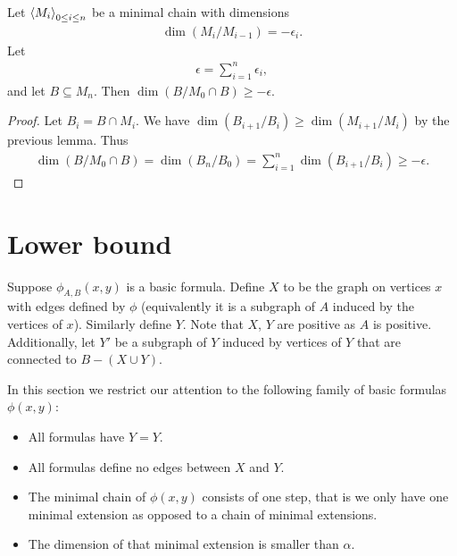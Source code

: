 \begin{Lemma} \label{chain_intersect}
  Let  $\left\langle M_i \right\rangle_{0 \leq i \leq n}$ be  a minimal chain with dimensions
  \begin{align*}
    \dim(M_i/M_{i-1}) = -\epsilon_i.
  \end{align*}
  Let
  \begin{align*}
    \epsilon = \sum_{i = 1}^{n}\epsilon_i,  
  \end{align*}
  and let $B \subseteq M_n$.
  Then $\dim (B / M_0 \cap B) \geq -\epsilon$.
\end{Lemma}

\begin{proof}
  Let $B_i = B \cap M_i$.
  We have $\dim (B_{i+1}/B_i) \geq \dim (M_{i+1}/M_i)$ by the previous lemma.
  Thus
  \begin{align*}
    \dim (B / M_0 \cap B) = \dim (B_n / B_0) = \sum_{i = 1}^n \dim (B_{i+1}/B_i) \geq -\epsilon.
  \end{align*}
\end{proof}

\section{Lower bound}
\begin{Definition} \label{def_basic}
  Suppose $\phi_{A,B}(x, y)$ is a basic formula.
  Define $X$ to be the graph on vertices $x$ with edges defined by $\phi$
  (equivalently it is a subgraph of $A$ induced by the vertices of $x$).
  Similarly define $Y$.
  Note that $X$, $Y$ are positive as $A$ is positive.
  Additionally, let $Y'$ be a subgraph of $Y$ induced by vertices of $Y$ that are connected to $B - (X \cup Y)$.
\end{Definition}

In this section we restrict our attention to the following family of basic formulas $\phi(x,y)$:
\begin{itemize}
\item All formulas have $Y = Y$.%
\item All formulas define no edges between $X$ and $Y$.
\item The minimal chain of $\phi(x,y)$ consists of one step, that is we only have one minimal extension as opposed to a chain of minimal extensions.
\item The dimension of that minimal extension is smaller than $\alpha$.
\end{itemize}

